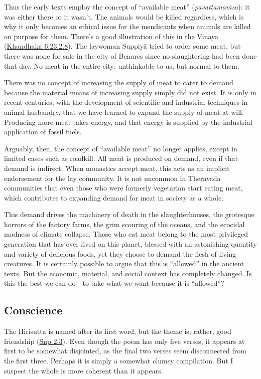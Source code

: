 \documentclass[12pt,openany]{book}%
\begin{document}
Thus the early texts employ the concept of “available meat” (\textit{\textsanskrit{pavattamaṁsa}}): it was either there or it wasn’t. The animals would be killed regardless, which is why it only becomes an ethical issue for the mendicants when animals are killed on purpose for them. There’s a good illustration of this in the Vinaya (\href{https://suttacentral.net/pli{-}tv{-}kd6/en/brahmali\#23.2.8}{Khandhaka 6:23.2.8}). The laywoman \textsanskrit{Suppiyā} tried to order some meat, but there was none for sale in the city of Benares since no slaughtering had been done that day. No meat in the entire city: unthinkable to us, but normal to them.

There was no concept of increasing the supply of meat to cater to demand because the material means of increasing supply simply did not exist. It is only in recent centuries, with the development of scientific and industrial techniques in animal husbandry, that we have learned to expand the supply of meat at will. Producing more meat takes energy, and that energy is supplied by the industrial application of fossil fuels.

Arguably, then, the concept of “available meat” no longer applies, except in limited cases such as roadkill. All meat is produced on demand, even if that demand is indirect. When monastics accept meat, this acts as an implicit endorsement for the lay community. It is not uncommon in Theravada communities that even those who were formerly vegetarian start eating meat, which contributes to expanding demand for meat in society as a whole.

This demand drives the machinery of death in the slaughterhouses, the grotesque horrors of the factory farms, the grim scouring of the oceans, and the ecocidal madness of climate collapse. Those who eat meat belong to the most privileged generation that has ever lived on this planet, blessed with an astonishing quantity and variety of delicious foods, yet they choose to demand the flesh of living creatures. It is certainly possible to argue that this is “allowed” in the ancient texts. But the economic, material, and social context has completely changed. Is this the best we can do—to take what we want because it is “allowed”?

\subsection*{Conscience}

The Hirisutta is named after its first word, but the theme is, rather, good friendship (\href{https://suttacentral.net/snp2.3/en/sujato}{Snp 2.3}). Even though the poem has only five verses, it appears at first to be somewhat disjointed, as the final two verses seem disconnected from the first three. Perhaps it is simply a somewhat clumsy compilation. But I suspect the whole is more coherent than it appears.
\end{document}
